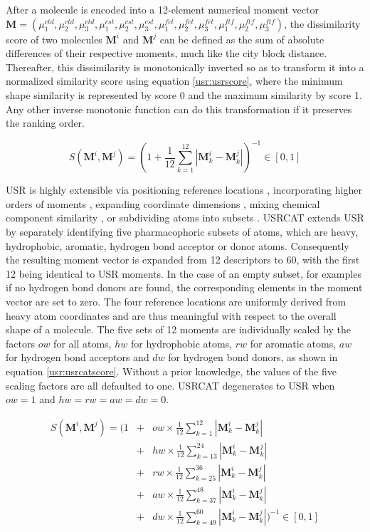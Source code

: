 After a molecule is encoded into a 12-element numerical moment vector $\mathbf M=(\mu_1^{ctd}, \mu_2^{ctd}, \mu_3^{ctd}, \mu_1^{cst}, \mu_2^{cst}, \mu_3^{cst}, \mu_1^{fct}, \mu_2^{fct}, \mu_3^{fct}, \mu_1^{ftf}, \mu_2^{ftf}, \mu_3^{ftf})$, the dissimilarity score of two molecules $\mathbf M^i$ and $\mathbf M^j$ can be defined as the sum of absolute differences of their respective moments, much like the city block distance. Thereafter, this dissimilarity is monotonically inverted so as to transform it into a normalized similarity score using equation \eqref{usr:usrscore}, where the minimum shape similarity is represented by score 0 and the maximum similarity by score 1. Any other inverse monotonic function can do this transformation if it preserves the ranking order.

\begin{equation}
S(\mathbf M^i, \mathbf M^j)=(1+\frac{1}{12}\sum_{k=1}^{12}|\mathbf M_k^i-\mathbf M_k^j|)^{-1}\in[0, 1]
\label{usr:usrscore}
\end{equation}

USR \citep{1379} is highly extensible via positioning reference locations \citep{1334,1335}, incorporating higher orders of moments \citep{1333,1337}, expanding coordinate dimensions \citep{1337,1338}, mixing chemical component similarity \citep{1333,1407,1408}, or subdividing atoms into subsets \citep{1436,1331}. USRCAT \citep{1331} extends USR \citep{1379} by separately identifying five pharmacophoric subsets of atoms, which are heavy, hydrophobic, aromatic, hydrogen bond acceptor or donor atoms. Consequently the resulting moment vector is expanded from 12 descriptors to 60, with the first 12 being identical to USR moments. In the case of an empty subset, for examples if no hydrogen bond donors are found, the corresponding elements in the moment vector are set to zero. The four reference locations are uniformly derived from heavy atom coordinates and are thus meaningful with respect to the overall shape of a molecule. The five sets of 12 moments are individually scaled by the factors $ow$ for all atoms, $hw$ for hydrophobic atoms, $rw$ for aromatic atoms, $aw$ for hydrogen bond acceptors and $dw$ for hydrogen bond donors, as shown in equation \eqref{usr:usrcatscore}. Without a prior knowledge, the values of the five scaling factors are all defaulted to one. USRCAT degenerates to USR when $ow=1$ and $hw=rw=aw=dw=0$.

\begin{eqnarray}
S(\mathbf M^i, \mathbf M^j)=(1
&+&ow\times\frac{1}{12}\sum_{k= 1}^{12}|\mathbf M_k^i-\mathbf M_k^j|\nonumber\\
&+&hw\times\frac{1}{12}\sum_{k=13}^{24}|\mathbf M_k^i-\mathbf M_k^j|\nonumber\\
&+&rw\times\frac{1}{12}\sum_{k=25}^{36}|\mathbf M_k^i-\mathbf M_k^j|\nonumber\\
&+&aw\times\frac{1}{12}\sum_{k=37}^{48}|\mathbf M_k^i-\mathbf M_k^j|\nonumber\\
&+&dw\times\frac{1}{12}\sum_{k=49}^{60}|\mathbf M_k^i-\mathbf M_k^j|)^{-1}\in[0, 1]
\label{usr:usrcatscore}
\end{eqnarray}

